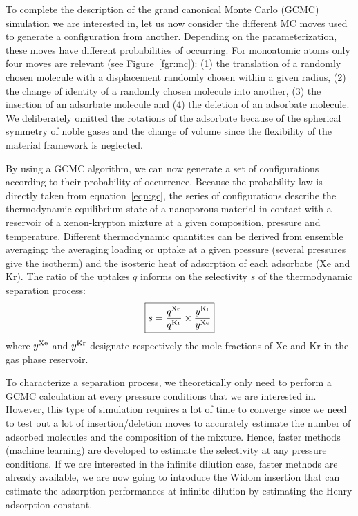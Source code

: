\documentclass[main.tex]{subfiles}
\begin{document}
To complete the description of the grand canonical Monte Carlo (GCMC) simulation we are interested in, let us now consider the different MC moves used to generate a configuration from another. Depending on the parameterization, these moves have different probabilities of occurring. For monoatomic atoms only four moves are relevant (see Figure~\ref{fgr:mc}): (1) the translation of a randomly chosen molecule with a displacement randomly chosen within a given radius, (2) the change of identity of a randomly chosen molecule into another, (3) the insertion of an adsorbate molecule and (4) the deletion of an adsorbate molecule. We deliberately omitted the rotations of the adsorbate because of the spherical symmetry of noble gases and the change of volume since the flexibility of the material framework is neglected. 

By using a GCMC algorithm, we can now generate a set of configurations according to their probability of occurrence. Because the probability law is directly taken from equation~\ref{eqn:gc}, the series of configurations describe the thermodynamic equilibrium state of a nanoporous material in contact with a reservoir of a xenon-krypton mixture at a given composition, pressure and temperature. Different thermodynamic quantities can be derived from ensemble averaging: the averaging loading or uptake at a given pressure (several pressures give the isotherm) and the isosteric heat of adsorption of each adsorbate (Xe and Kr). The ratio of the uptakes $q$ informs on the selectivity $s$ of the thermodynamic separation process: 
\begin{equation}\label{eq:selec}
  \boxed{
  s = \dfrac{q^{\text{Xe}}}{q^{\text{Kr}}}\times\dfrac{y^{\text{Kr}}}{y^{\text{Xe}}}
  }
\end{equation}
where $y^{\text{Xe}}$ and $y^{\text{Kr}}$ designate respectively the mole fractions of Xe and Kr in the gas phase reservoir.

To characterize a separation process, we theoretically only need to perform a GCMC calculation at every pressure conditions that we are interested in. However, this type of simulation requires a lot of time to converge since we need to test out a lot of insertion/deletion moves to accurately estimate the number of adsorbed molecules and the composition of the mixture. Hence, faster methods (machine learning) are developed to estimate the selectivity at any pressure conditions.\cite{Simon_2015,Kang_2023} If we are interested in the infinite dilution case, faster methods are already available, we are now going to introduce the Widom insertion that can estimate the adsorption performances at infinite dilution by estimating the Henry adsorption constant.
\end{document}

